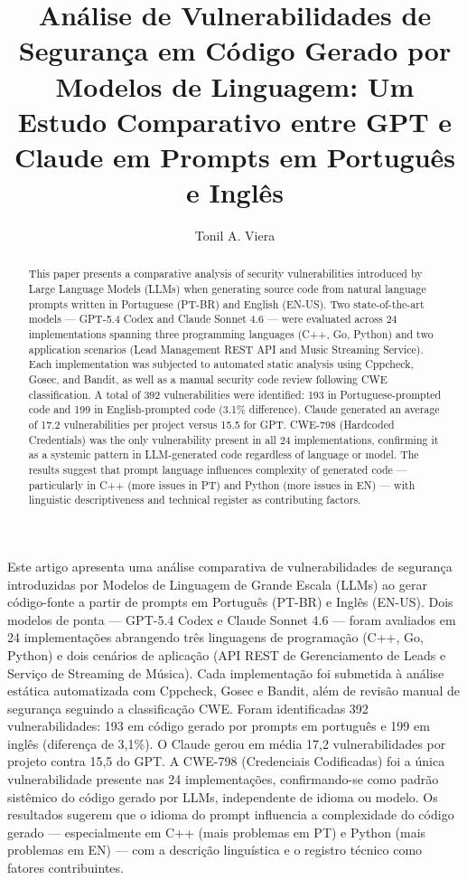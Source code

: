 \documentclass[12pt]{article}
\title{Análise de Vulnerabilidades de Segurança em Código Gerado por Modelos de Linguagem: Um Estudo Comparativo entre GPT e Claude em Prompts em Português e Inglês}
\author{Tonil A. Viera\inst{1}}
\begin{document}
\maketitle

\begin{abstract}
This paper presents a comparative analysis of security vulnerabilities introduced by Large Language Models (LLMs) when generating source code from natural language prompts written in Portuguese (PT-BR) and English (EN-US). Two state-of-the-art models — GPT-5.4 Codex and Claude Sonnet 4.6 — were evaluated across 24 implementations spanning three programming languages (C++, Go, Python) and two application scenarios (Lead Management REST API and Music Streaming Service). Each implementation was subjected to automated static analysis using Cppcheck, Gosec, and Bandit, as well as a manual security code review following CWE classification. A total of 392 vulnerabilities were identified: 193 in Portuguese-prompted code and 199 in English-prompted code (3.1\% difference). Claude generated an average of 17.2 vulnerabilities per project versus 15.5 for GPT. CWE-798 (Hardcoded Credentials) was the only vulnerability present in all 24 implementations, confirming it as a systemic pattern in LLM-generated code regardless of language or model. The results suggest that prompt language influences complexity of generated code — particularly in C++ (more issues in PT) and Python (more issues in EN) — with linguistic descriptiveness and technical register as contributing factors.
\end{abstract}

\begin{resumo}
Este artigo apresenta uma análise comparativa de vulnerabilidades de segurança introduzidas por Modelos de Linguagem de Grande Escala (LLMs) ao gerar código-fonte a partir de prompts em Português (PT-BR) e Inglês (EN-US). Dois modelos de ponta — GPT-5.4 Codex e Claude Sonnet 4.6 — foram avaliados em 24 implementações abrangendo três linguagens de programação (C++, Go, Python) e dois cenários de aplicação (API REST de Gerenciamento de Leads e Serviço de Streaming de Música). Cada implementação foi submetida à análise estática automatizada com Cppcheck, Gosec e Bandit, além de revisão manual de segurança seguindo a classificação CWE. Foram identificadas 392 vulnerabilidades: 193 em código gerado por prompts em português e 199 em inglês (diferença de 3,1\%). O Claude gerou em média 17,2 vulnerabilidades por projeto contra 15,5 do GPT. A CWE-798 (Credenciais Codificadas) foi a única vulnerabilidade presente nas 24 implementações, confirmando-se como padrão sistêmico do código gerado por LLMs, independente de idioma ou modelo. Os resultados sugerem que o idioma do prompt influencia a complexidade do código gerado — especialmente em C++ (mais problemas em PT) e Python (mais problemas em EN) — com a descrição linguística e o registro técnico como fatores contribuintes.
\end{resumo}
\end{document}
